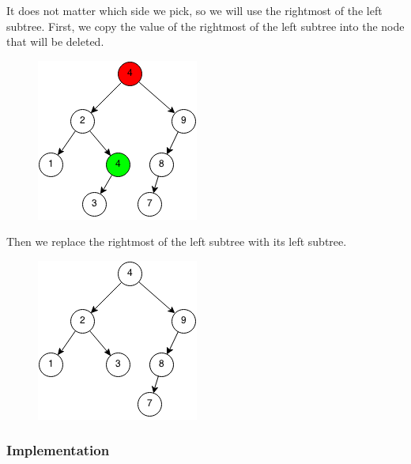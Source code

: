 \documentclass[11pt,oneside]{book}
\makeatletter
\def\maxwidth#1{\ifdim\Gin@nat@width>#1 #1\else\Gin@nat@width\fi}
\makeatother
\begin{document}
It does not matter which side we pick, so we will use the rightmost of the left subtree. First, we copy the value of the rightmost of the left subtree into the node that will be deleted.

\vspace{5px}\begin{figure}[H]\centering
        \includegraphics[width=0.66\maxwidth{\textwidth}]{bst-rem-case33.png}
        \end{figure}

Then we replace the rightmost of the left subtree with its left subtree.

\vspace{5px}\begin{figure}[H]\centering
        \includegraphics[width=0.66\maxwidth{\textwidth}]{bst-rem-case34.png}
        \end{figure}

\subsubsection{Implementation}
\end{document}
